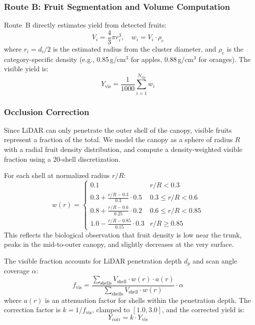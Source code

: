 \documentclass[article,final]{iclr2024_conference}
\begin{document}
\subsubsection{Route B: Fruit Segmentation and Volume Computation}

Route~B directly estimates yield from detected fruits:
\begin{equation}
V_i = \frac{4}{3}\pi r_i^3, \quad w_i = V_i \cdot \rho_c
\end{equation}
where $r_i = d_i/2$ is the estimated radius from the cluster diameter, and $\rho_c$ is the category-specific density (e.g., 0.85\,g/cm$^3$ for apples, 0.88\,g/cm$^3$ for oranges). The visible yield is:
\begin{equation}
Y_{\text{vis}} = \frac{1}{1000}\sum_{i=1}^{N_{\text{vis}}} w_i
\end{equation}

\subsubsection{Occlusion Correction}

Since LiDAR can only penetrate the outer shell of the canopy, visible fruits represent a fraction of the total. We model the canopy as a sphere of radius $R$ with a radial fruit density distribution, and compute a density-weighted visible fraction using a 20-shell discretization.

For each shell at normalized radius $r/R$:
\begin{equation}
w(r) = \begin{cases}
0.1 & r/R < 0.3 \\
0.3 + \frac{r/R - 0.3}{0.3} \cdot 0.5 & 0.3 \leq r/R < 0.6 \\
0.8 + \frac{r/R - 0.6}{0.25} \cdot 0.2 & 0.6 \leq r/R < 0.85 \\
1.0 - \frac{r/R - 0.85}{0.15} \cdot 0.3 & r/R \geq 0.85
\end{cases}
\label{eq:density-weight}
\end{equation}
This reflects the biological observation that fruit density is low near the trunk, peaks in the mid-to-outer canopy, and slightly decreases at the very surface.

The visible fraction accounts for LiDAR penetration depth $d_p$ and scan angle coverage $\alpha$:
\begin{equation}
f_{\text{vis}} = \frac{\sum_{\text{shells}} V_{\text{shell}} \cdot w(r) \cdot a(r)}{\sum_{\text{shells}} V_{\text{shell}} \cdot w(r)} \cdot \alpha
\end{equation}
where $a(r)$ is an attenuation factor for shells within the penetration depth. The correction factor is $k = 1/f_{\text{vis}}$, clamped to $[1.0, 3.0]$, and the corrected yield is:
\begin{equation}
Y_{\text{corr}} = k \cdot Y_{\text{vis}}
\end{equation}
\end{document}
